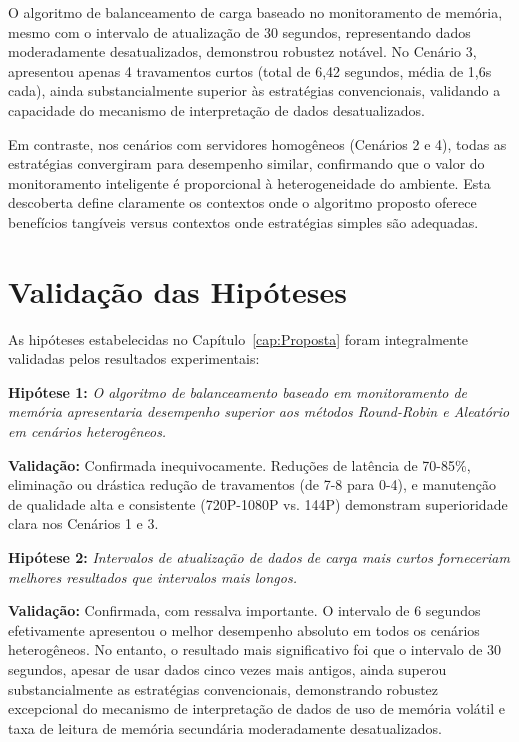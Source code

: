 O algoritmo de balanceamento de carga baseado no monitoramento de memória, mesmo com o intervalo de atualização de 30 segundos, representando dados moderadamente desatualizados, demonstrou robustez notável. No Cenário 3, apresentou apenas 4 travamentos curtos (total de 6,42 segundos, média de 1,6s cada), ainda substancialmente superior às estratégias convencionais, validando a capacidade do mecanismo de interpretação de dados desatualizados.

Em contraste, nos cenários com servidores homogêneos (Cenários 2 e 4), todas as estratégias convergiram para desempenho similar, confirmando que o valor do monitoramento inteligente é proporcional à heterogeneidade do ambiente. Esta descoberta define claramente os contextos onde o algoritmo proposto oferece benefícios tangíveis versus contextos onde estratégias simples são adequadas.

\section{Validação das Hipóteses}

As hipóteses estabelecidas no Capítulo~\ref{cap:Proposta} foram integralmente validadas pelos resultados experimentais:

\textbf{Hipótese 1:} \textit{O algoritmo de balanceamento baseado em monitoramento de memória apresentaria desempenho superior aos métodos \textit{Round-Robin} e Aleatório em cenários heterogêneos.}

\textbf{Validação:} Confirmada inequivocamente. Reduções de latência de 70-85\%, eliminação ou drástica redução de travamentos (de 7-8 para 0-4), e manutenção de qualidade alta e consistente (720P-1080P vs. 144P) demonstram superioridade clara nos Cenários 1 e 3.

\textbf{Hipótese 2:} \textit{Intervalos de atualização de dados de carga mais curtos forneceriam melhores resultados que intervalos mais longos.}

\textbf{Validação:} Confirmada, com ressalva importante. O intervalo de 6 segundos efetivamente apresentou o melhor desempenho absoluto em todos os cenários heterogêneos. No entanto, o resultado mais significativo foi que o intervalo de 30 segundos, apesar de usar dados cinco vezes mais antigos, ainda superou substancialmente as estratégias convencionais, demonstrando robustez excepcional do mecanismo de interpretação de dados de uso de memória volátil e taxa de leitura de memória secundária moderadamente desatualizados.

